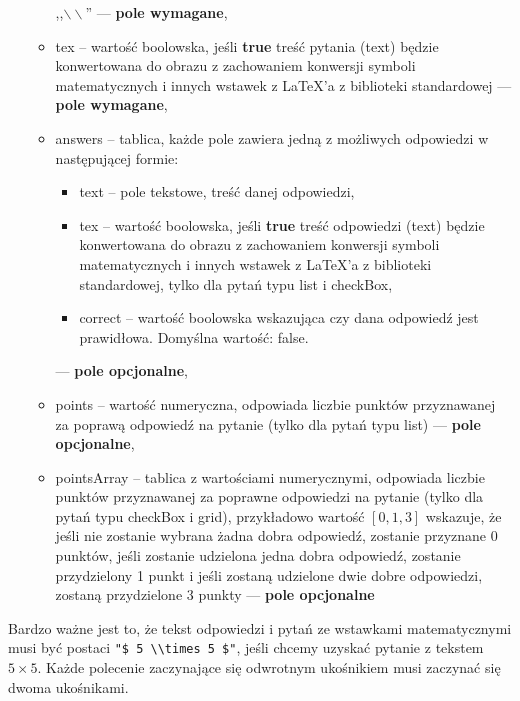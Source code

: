 \begin{itemize}
\begin{itemize}
    ,,$\backslash\backslash$'' --- \textbf{pole wymagane},
    \item{tex} -- wartość boolowska, jeśli \textbf{true} treść pytania (text) będzie
    konwertowana do obrazu z zachowaniem konwersji symboli matematycznych i innych
    wstawek z \LaTeX{}'a z biblioteki standardowej --- \textbf{pole wymagane},
    \item{answers} -- tablica, każde pole zawiera jedną z możliwych odpowiedzi w
    następującej formie:
    \begin{itemize}
      \item text -- pole tekstowe, treść danej odpowiedzi,
      \item tex -- wartość boolowska, jeśli \textbf{true} treść odpowiedzi (text) będzie
      konwertowana do obrazu z zachowaniem konwersji symboli matematycznych i innych
      wstawek z \LaTeX{}'a z biblioteki standardowej, tylko dla pytań typu list i checkBox,
      \item correct -- wartość boolowska wskazująca czy dana odpowiedź jest prawidłowa.
      Domyślna wartość: false.
    \end{itemize} 
    --- \textbf{pole opcjonalne},
    \item{points} -- wartość numeryczna, odpowiada liczbie punktów przyznawanej za
    poprawą odpowiedź na pytanie (tylko dla pytań typu list)
    --- \textbf{pole opcjonalne},
    \item{pointsArray} -- tablica z wartościami numerycznymi, odpowiada liczbie punktów
    przyznawanej za poprawne odpowiedzi na pytanie (tylko dla pytań typu checkBox i grid),
    przykładowo wartość $ [0, 1, 3] $ wskazuje, że jeśli nie zostanie wybrana żadna dobra
    odpowiedź, zostanie przyznane 0 punktów, jeśli zostanie udzielona jedna dobra odpowiedź,
    zostanie przydzielony 1 punkt i jeśli zostaną udzielone dwie dobre odpowiedzi, zostaną
    przydzielone 3 punkty
    --- \textbf{pole opcjonalne}
  \end{itemize}
\end{itemize}

Bardzo ważne jest to, że tekst odpowiedzi i pytań ze wstawkami matematycznymi
musi być postaci \texttt{"\$ 5 \textbackslash \textbackslash times 5 \$"}, jeśli
chcemy uzyskać pytanie z tekstem $ 5 \times 5 $. Każde polecenie zaczynające się
odwrotnym ukośnikiem musi zaczynać się dwoma ukośnikami.

